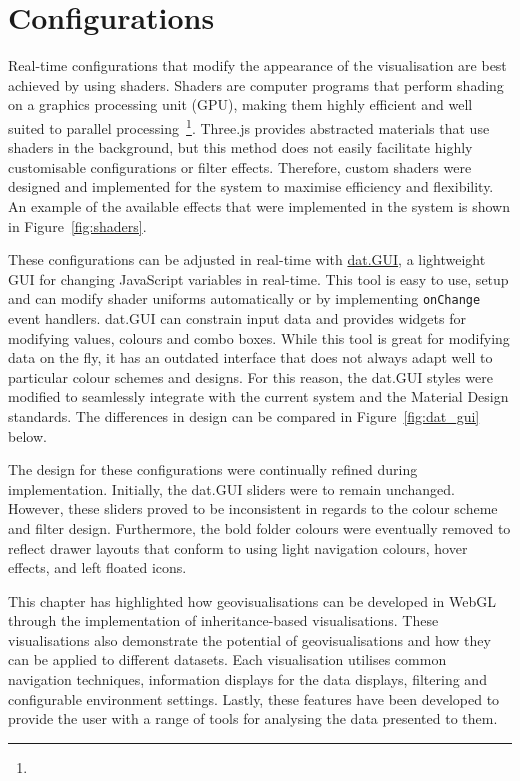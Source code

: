 \section{Configurations} {
\label{sec:configurations}

	Real-time configurations that modify the appearance of the visualisation are best achieved by using shaders. Shaders are computer programs that perform shading on a graphics processing unit (GPU), making them highly efficient and well suited to parallel processing~\footnote{}. Three.js provides abstracted materials that use shaders in the background, but this method does not easily facilitate highly customisable configurations or filter effects. Therefore, custom shaders were designed and implemented for the system to maximise efficiency and flexibility. An example of the available effects that were implemented in the system is shown in Figure~\ref{fig:shaders}.

	

	These configurations can be adjusted in real-time with \href{http://workshop.chromeexperiments.com/}{dat.GUI}, a lightweight GUI for changing JavaScript variables in real-time. This tool is easy to use, setup and can modify shader uniforms automatically or by implementing \texttt{onChange} event handlers. dat.GUI can constrain input data and provides widgets for modifying values, colours and combo boxes. While this tool is great for modifying data on the fly, it has an outdated interface that does not always adapt well to particular colour schemes and designs. For this reason, the dat.GUI styles were modified to seamlessly integrate with the current system and the Material Design standards. The differences in design can be compared in Figure~\ref{fig:dat_gui} below.

	

	The design for these configurations were continually refined during implementation. Initially, the dat.GUI sliders were to remain unchanged. However, these sliders proved to be inconsistent in regards to the colour scheme and filter design. Furthermore, the bold folder colours were eventually removed to reflect drawer layouts that conform to using light navigation colours, hover effects, and left floated icons.

}

This chapter has highlighted how geovisualisations can be developed in WebGL through the implementation of inheritance-based visualisations. These visualisations also demonstrate the potential of geovisualisations and how they can be applied to different datasets. Each visualisation utilises common navigation techniques, information displays for the data displays, filtering and configurable environment settings. Lastly, these features have been developed to provide the user with a range of tools for analysing the data presented to them.
